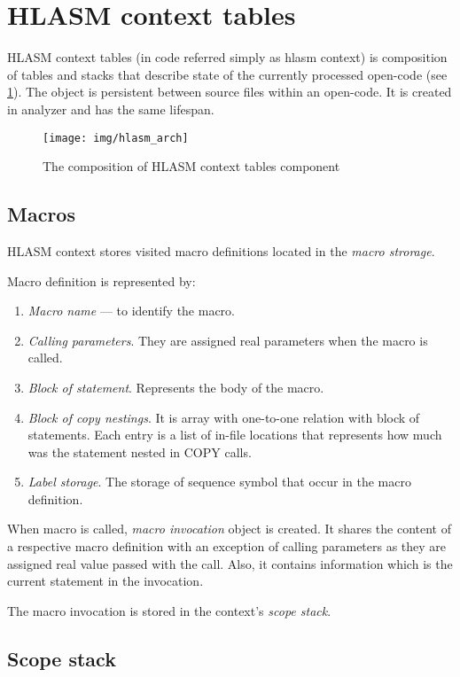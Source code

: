 \section{HLASM context tables}

HLASM context tables (in code referred simply as hlasm context) is composition of tables and stacks that describe state of the currently processed open-code (see \cref{fig06:hlasm}). The object is persistent between source files within an open-code. It is created in analyzer and has the same lifespan. 

\begin{figure}
	\centering
	\texttt{[image: img/hlasm\_arch]}
	\caption{The composition of HLASM context tables component}
	\label{fig06:hlasm}
\end{figure}

\subsection{Macros}

HLASM context stores visited macro definitions located in the \emph{macro strorage}. 

Macro definition is represented by:
\begin{enumerate}
	\item \emph{Macro name} --- to identify the macro.
	\item \emph{Calling parameters}. They are assigned real parameters when the macro is called.
	\item \emph{Block of statement}. Represents the body of the macro.
	\item \emph{Block of copy nestings}. It is array with one-to-one relation with block of statements. Each entry is a list of in-file locations that represents how much was the statement nested in COPY calls.
	\item \emph{Label storage}. The storage of sequence symbol that occur in the macro definition.
\end{enumerate}

When macro is called, \emph{macro invocation} object is created. It shares the content of a respective macro definition with an exception of calling parameters as they are assigned real value passed with the call. Also, it contains information which is the current statement in the invocation.

The macro invocation is stored in the context's \emph{scope stack}.

\subsection{Scope stack}

